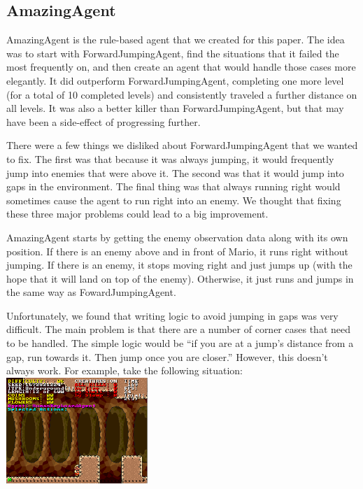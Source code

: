 \documentclass[12pt]{article}
\begin{document}
\begin{multicols*}{2}
\subsection*{AmazingAgent}
AmazingAgent is the rule-based agent that we created for this paper.  The idea was to start with 
ForwardJumpingAgent, find the situations that it failed the most frequently on, and then create 
an agent that would handle those cases more elegantly.  It did outperform ForwardJumpingAgent, 
completing one more level (for a total of 10 completed levels) and consistently traveled a further 
distance on all levels.  It was also a better killer than ForwardJumpingAgent, but that may have 
been a side-effect of progressing further.

There were a few things we disliked about ForwardJumpingAgent that we wanted to fix.  The 
first was that because it was always jumping, it would frequently jump into enemies that were above 
it.  The second was that it would jump into gaps in the environment.  The final thing was that always 
running right would sometimes cause the agent to run right into an enemy.  We thought that fixing these 
three major problems could lead to a big improvement.

AmazingAgent starts by getting the enemy observation data along with its own position.  If there is 
an enemy above and in front of Mario, it runs right without jumping.  If there is an enemy, it stops 
moving right and just jumps up (with the hope that it will land on top of the enemy).  Otherwise, 
it just runs and jumps in the same way as FowardJumpingAgent.

Unfortunately, we found that writing logic to avoid jumping in gaps was very difficult.  The main 
problem is that there are a number of corner cases that need to be handled.  The simple logic would 
be ``if you are at a jump's distance from a gap, run towards it.  Then jump once you are closer.''  
However, this doesn't always work.  For example, take the following situation:
\hspace{5mm}
\\

\begingroup
    \centering
    \includegraphics[width=0.4\textwidth]{gap_issue}
\endgroup


\end{multicols*}
\end{document}
